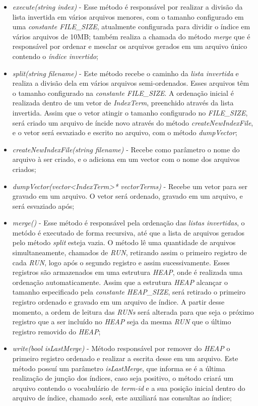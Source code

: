 \documentclass[12pt]{article}
\begin{document}
\begin{itemize}
\item \textit{execute(string index)} - Esse método é responsável por realizar a divisão da lista invertida em vários arquivos menores, com o tamanho configurado em uma \textit{constante FILE\_SIZE}, atualmente configurada para dividir o índice em vários arquivos de 10MB; também realiza a chamada do método \textit{merge} que é responsável por ordenar e mesclar os arquivos gerados em um arquivo único contendo o \textit{índice invertido};
\item \textit{split(string filename)} - Este método recebe o caminho da \textit{lista invertida} e realiza a divisão dela em vários arquivos semi-ordenados. Esses arquivos têm o tamanho configurado na \textit{constante FILE\_SIZE}. A ordenação inicial é realizada dentro de um vetor de \textit{IndexTerm}, preenchido através da lista invertida. Assim que o vetor atingir o tamanho configurado no \textit{FILE\_SIZE}, será criado um arquivo de íncide novo através do método \textit{createNewIndexFile}, e o vetor será esvaziado e escrito no arquivo, com o método \textit{dumpVector};
\item \textit{createNewIndexFile(string filename)} - Recebe como parâmetro o nome do arquivo à ser criado, e o adiciona em um vector com o nome dos arquivos criados;
\item \textit{dumpVector(vector<IndexTerm>* vectorTerms)} - Recebe um vetor para ser gravado em um arquivo. O vetor será ordenado, gravado em um arquivo, e será esvaziado após;
\item \textit{merge()} - Esse método é responsável pela ordenação das \textit{listas invertidas}, o metódo é executado de forma recursiva, até que a lista de arquivos gerados pelo método \textit{split} esteja vazia. O método lê uma quantidade de arquivos simultaneamente, chamados de \textit{RUN}, retirando assim o primeiro registro de cada \textit{RUN}, logo após o segundo registro e assim sucessivamente. Esses registros são armazenados em uma estrutura \textit{HEAP}, onde é realizada uma ordenação automaticamente. Assim que a estrutura \textit{HEAP} alcançar o tamanho especificado pela \textit{constante HEAP\_SIZE}, será retirado o primeiro registro ordenado e gravado em um arquivo de índice. A partir desse momento, a ordem de leitura das \textit{RUNs} será alterada para que seja o próximo registro que a ser incluído no \textit{HEAP} seja da mesma \textit{RUN} que o último registro removido do \textit{HEAP};
\item \textit{write(bool isLastMerge)} - Método responsável por remover do \textit{HEAP} o primeiro registro ordenado e realizar a escrita desse em um arquivo. Este método possuí um parâmetro \textit{isLastMerge}, que informa se é a última realização de junção dos índices, caso seja positivo, o método criará um arquivo contendo o vocabulário de \textit{term-id} e a sua posição inicial dentro do arquivo de índice, chamado \textit{seek}, este auxiliará nas consultas ao índice;

\end{itemize}
\end{document}
